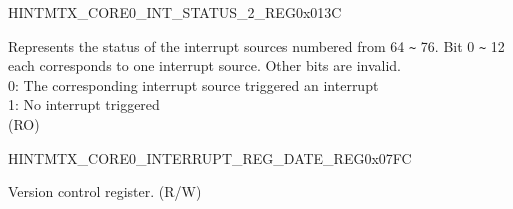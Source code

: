 \begin{register}{H}{INTMTX\_CORE0\_INT\_STATUS\_2\_REG}{0x013C}\label{regdesc:INTMTXCORE0INTSTATUS2REG}
%
\regnewline%
\begin{regdesc}\begin{reglist}
\label{fielddesc:INTMTXCORE0INTSTATUS2}\item [INTMTX\_CORE0\_INT\_STATUS\_2] Represents the status of the interrupt sources numbered from 64 \verb+~+ 76. Bit 0 \verb+~+ 12 each corresponds to one interrupt source. Other bits are invalid. \\
0: The corresponding interrupt source triggered an interrupt\\
1: No interrupt triggered\\
(RO)
\end{reglist}\end{regdesc}
\end{register}




\begin{register}{H}{INTMTX\_CORE0\_INTERRUPT\_REG\_DATE\_REG}{0x07FC}\label{regdesc:INTMTXCORE0INTERRUPTREGDATEREG}
%
%
\regnewline%
\begin{regdesc}\begin{reglist}
\label{fielddesc:INTMTXCORE0INTERRUPTREGDATE}\item [INTMTX\_CORE0\_INTERRUPT\_REG\_DATE] Version control register. (R/W)
\end{reglist}\end{regdesc}
\end{register}
